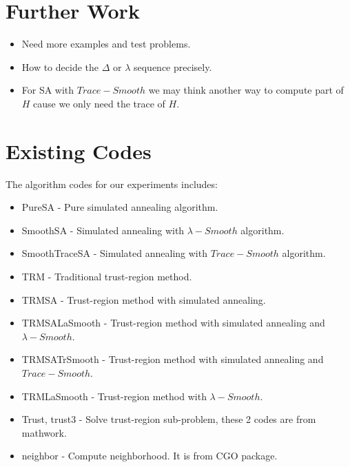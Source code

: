 \documentclass[letterpaper,12pt,titlepage,oneside,final]{book}
\begin{document}
\section{Further Work}

\begin{itemize}

\item Need more examples and test problems.

\item How to decide the $\Delta$ or $\lambda$ sequence precisely.

\item For SA with $Trace-Smooth$ we may think another way to compute part of $H$ cause we only need the trace of $H$.

\end{itemize}

\section{Existing Codes}

The algorithm codes for our experiments includes:

\begin{itemize}

\item PureSA - Pure simulated annealing algorithm.

\item SmoothSA - Simulated annealing with $\lambda-Smooth$ algorithm.

\item SmoothTraceSA - Simulated annealing with $Trace-Smooth$ algorithm.

\item TRM - Traditional trust-region method.

\item TRMSA - Trust-region method with simulated annealing.

\item TRMSALaSmooth - Trust-region method with simulated annealing and $\lambda-Smooth$.

\item TRMSATrSmooth - Trust-region method with simulated annealing and $Trace-Smooth$.

\item TRMLaSmooth - Trust-region method with $\lambda-Smooth$.

\item Trust, trust3 - Solve trust-region sub-problem, these 2 codes are from mathwork.

\item neighbor - Compute neighborhood. It is from CGO package.

\end{itemize}
\end{document}
